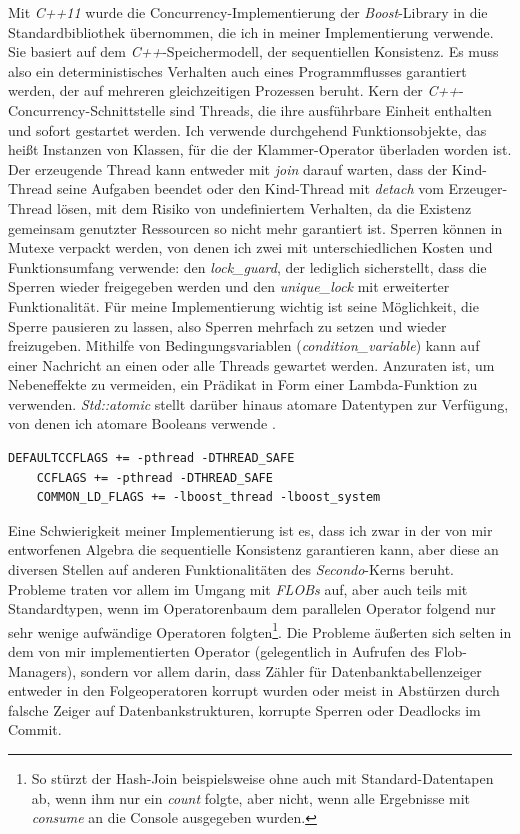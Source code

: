 \documentclass[a4paper,12pt,twoside]{article}
\newcommand{\Fb}[1]{\textit{#1}} %
\begin{document}
Mit \Fb{C++11} wurde die Concurrency-Implementierung der \Fb{Boost}-Library in die Standardbibliothek übernommen, die ich in meiner Implementierung verwende. Sie basiert auf dem \Fb{C++}-Speichermodell, der sequentiellen Konsistenz. Es muss also ein deterministisches Verhalten auch eines Programmflusses garantiert werden, der auf mehreren gleichzeitigen Prozessen beruht. Kern der \Fb{C++}-Concurrency-Schnittstelle sind Threads, die ihre ausführbare Einheit enthalten und sofort gestartet werden. Ich verwende durchgehend Funktionsobjekte, das heißt Instanzen von Klassen, für die der Klammer-Operator überladen worden ist. Der erzeugende Thread kann entweder mit \Fb{join} darauf warten, dass der Kind-Thread seine Aufgaben beendet oder den Kind-Thread mit \Fb{detach} vom Erzeuger-Thread lösen, mit dem Risiko von undefiniertem Verhalten, da die Existenz gemeinsam genutzter Ressourcen so nicht mehr garantiert ist. Sperren können in Mutexe verpackt werden, von denen ich zwei mit unterschiedlichen Kosten und Funktionsumfang verwende: den \Fb{lock\_guard}, der lediglich sicherstellt, dass die Sperren wieder freigegeben werden und den \Fb{unique\_lock} mit erweiterter Funktionalität. Für meine Implementierung wichtig ist seine Möglichkeit, die Sperre pausieren zu lassen, also Sperren mehrfach zu setzen und wieder freizugeben. Mithilfe von Bedingungsvariablen (\Fb{condition\_variable}) kann auf einer Nachricht an einen oder alle Threads gewartet werden. Anzuraten ist, um Nebeneffekte zu vermeiden, ein Prädikat in Form einer Lambda-Funktion zu verwenden. \Fb{Std::atomic} stellt darüber hinaus atomare Datentypen zur Verfügung, von denen ich atomare Booleans verwende \parencite{Grimm2018}. 

\begin{minipage}{0.95\textwidth}
	\begin{lstlisting}[caption={Flags der \Fb{MThreaded}-Algebra.}, label=list:flags]
	DEFAULTCCFLAGS += -pthread -DTHREAD_SAFE
	CCFLAGS += -pthread -DTHREAD_SAFE
	COMMON_LD_FLAGS += -lboost_thread -lboost_system
	\end{lstlisting}
\end{minipage}

Eine Schwierigkeit meiner Implementierung ist es, dass ich zwar in der von mir entworfenen Algebra die sequentielle Konsistenz garantieren kann, aber diese an diversen Stellen auf anderen Funktionalitäten des \Fb{Secondo}-Kerns beruht. Probleme traten vor allem im Umgang mit \Fb{FLOBs} auf, aber auch teils mit Standardtypen, wenn im Operatorenbaum dem parallelen Operator folgend nur sehr wenige aufwändige Operatoren folgten\footnote{So stürzt der Hash-Join beispielsweise ohne auch mit Standard-Datentapen ab, wenn ihm nur ein \Fb{count} folgte, aber nicht, wenn alle Ergebnisse mit \Fb{consume} an die Console ausgegeben wurden.}. Die Probleme äußerten sich selten in dem von mir implementierten Operator (gelegentlich in Aufrufen des Flob-Managers), sondern vor allem darin, dass Zähler für Datenbanktabellenzeiger entweder in den Folgeoperatoren korrupt wurden oder meist in Abstürzen durch falsche Zeiger auf Datenbankstrukturen, korrupte Sperren oder Deadlocks im Commit. 
\end{document}
